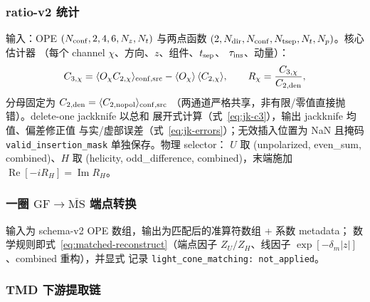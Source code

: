 \documentclass[11pt,a4paper]{ctexart}
\newcommand{\MSbarM}{\overline{\text{MS}}}
\newcommand{\abs}[1]{\lvert #1\rvert}
\newcommand{\code}[1]{\texttt{#1}}
\newcommand{\GFr}{\mathrm{GF}}
\begin{document}
\subsubsection{ratio-v2 统计}

输入：OPE $(N_{\rm conf},2,4,6,N_z,N_t)$ 与两点函数
$(2,N_{\rm dir},N_{\rm conf},N_{\rm tsep},N_t,N_p)$。核心估计器
（每个 channel $\chi$、方向、$z$、组件、$t_{\rm sep}$、
$\tau_{\rm ins}$、动量）：
\begin{equation}
C_{3,\chi} = \langle O_\chi C_{2,\chi}\rangle_{\rm conf,src}
-\langle O_\chi\rangle\,\langle C_{2,\chi}\rangle, \qquad
R_\chi = \frac{C_{3,\chi}}{C_{2,\rm den}},
\end{equation}
分母固定为 $C_{2,\rm den}=\langle C_{2,\rm nopol}\rangle_{\rm conf,src}$
（两通道严格共享，非有限/零值直接抛错）。delete-one jackknife 以总和
展开式计算（式~\eqref{eq:jk-c3}），输出 jackknife 均值、偏差修正值
与实/虚部误差（式~\eqref{eq:jk-errors}）；无效插入位置为 NaN 且掩码
\code{valid\_insertion\_mask} 单独保存。物理 selector：
$U$ 取 (unpolarized, even\_sum, combined)、$H$ 取 (helicity,
odd\_difference, combined)，末端施加
$\operatorname{Re}[-iR_H]=\operatorname{Im}R_H$。

\subsubsection{一圈 $\GFr\to\MSbarM$ 端点转换}

输入为 schema-v2 OPE 数组，输出为匹配后的准算符数组 + 系数 metadata；
数学规则即式~\eqref{eq:matched-reconstruct}（端点因子
$Z_U/Z_H$、线因子 $\exp[-\delta_m\abs z]$、combined 重构），并显式
记录 \code{light\_cone\_matching: not\_applied}。

\subsubsection{TMD 下游提取链}
\end{document}
